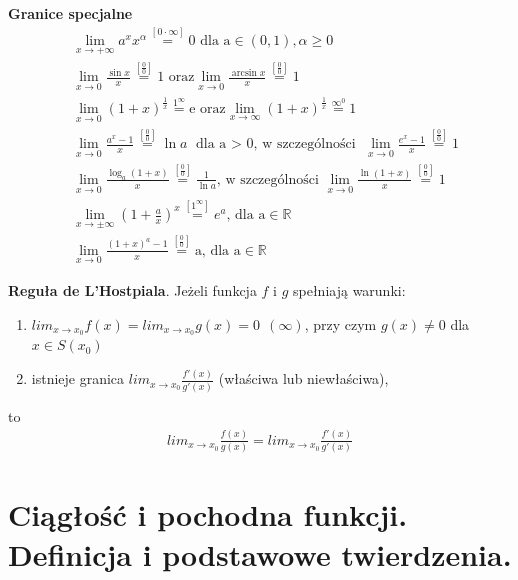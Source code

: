 \documentclass[12pt]{article}
\begin{document}
    \begin{theorem}
    	\textbf{Granice specjalne}
    	\setlength{\jot}{10pt}
    	\begin{align*}
    		&\lim_{x \to +\infty} a^{x} x^{\alpha} \stackrel{[0 \cdot \infty]}{=}  \text{0 dla a} \in (0, 1), \alpha \geq 0 \\
    		&\lim_{x \to 0} \frac{\sin{x}}{x} \stackrel{[\frac{0}{0}]}{=} \text{1 oraz}    \lim_{x \to 0} \frac{\arcsin{x}}{x} \stackrel{[\frac{0}{0}]}{=} 1\\
    		&\lim_{x \to 0} (1 + x)^{\frac{1}{x}} \stackrel{1^{\infty}}{=} \text{e oraz}   \lim_{x \to \infty} (1 + x)^{\frac{1}{x}} \stackrel{\infty^{0}}{=} 1 \\
    		&\lim_{x \to 0} \frac{a^x -1}{x} \stackrel{[\frac{0}{0}]}{=} \ln{a} \text{ dla  a $>$ 0, w szczególności } \lim_{x \to 0} \frac{e^x -1}{x} \stackrel{[\frac{0}{0}]}{=} 1 \\
    		&\lim_{x \to 0} \frac{\log_{a}(1 + x)}{x} \stackrel{[\frac{0}{0}]}{=} \frac{1}{\ln{a}} \text{, w szczególności } \lim_{x \to 0} \frac{\ln(1 + x)}{x} \stackrel{[\frac{0}{0}]}{=} 1 \\
    		&\lim_{x \to \pm \infty} (1 + \frac{a}{x})^{x} \stackrel{[1^{\infty}]}{=} e^{a} \text{, dla a} \in \mathbb{R} \\
    		&\lim_{x \to 0} \frac{(1 + x)^a - 1}{x} \stackrel{[\frac{0}{0}]}{=} \text{a, dla a} \in \mathbb{R}
    	\end{align*}
    \end{theorem}

    \begin{theorem}
        \textbf{Reguła de L'Hostpiala}. Jeżeli funkcja $f$ i  $g$ spełniają warunki:
        \begin{enumerate}
            \item $lim_{x \rightarrow x_0} f(x) = lim_{x \rightarrow x_0} g(x) = 0 ~~ (\infty)$, przy czym $g(x) \neq 0$ dla $x \in S(x_0)$
            \item istnieje granica $lim_{x \rightarrow x_0} \frac{f'(x)}{g'(x)}$ (właściwa lub niewłaściwa),
        \end{enumerate}
        to
        \begin{align*}
            lim_{x \rightarrow x_0} \frac{f(x)}{g(x)} = lim_{x \rightarrow x_0} \frac{f'(x)}{g'(x)}
        \end{align*}
    \end{theorem}

    \newpage

    \section{Ciągłość i pochodna funkcji. Definicja i podstawowe twierdzenia.}
\end{document}
